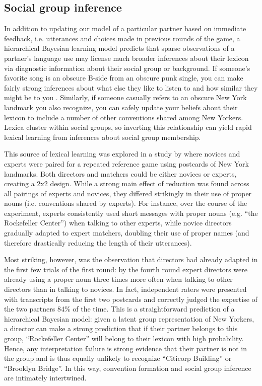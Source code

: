 \subsection{Social group inference}

In addition to updating our model of a particular partner based on immediate feedback, i.e. utterances and choices made in previous rounds of the game, a hierarchical Bayesian learning model predicts that sparse observations of a partner's language use may license much broader inferences about their lexicon via diagnostic information about their social group or background. If someone's favorite song is an obscure B-side from an obscure punk single, you can make fairly strong inferences about what else they like to listen to and how similar they might be to you \cite{VelezEtAl16_Overlaps, GershmanEtAl17_StructureSocialInfluence}. Similarly, if someone casually refers to an obscure New York landmark you also recognize, you can safely update your beliefs about their lexicon to include a number of other conventions shared among New Yorkers. Lexica cluster within social groups, so inverting this relationship can yield rapid lexical learning from inferences about social group membership.

This source of lexical learning was explored in a study by  where novices and experts were paired for a repeated reference game using postcards of New York landmarks. Both directors and matchers could be either novices or experts, creating a 2x2 design. While a strong main effect of reduction was found across all pairings of experts and novices, they differed strikingly in their use of proper nouns (i.e. conventions shared by experts). For instance, over the course of the experiment, experts consistently used short messages with proper nouns (e.g. ``the Rockefeller Center'') when talking to other experts, while novice directors gradually adapted to expert matchers, doubling their use of proper names (and therefore drastically reducing the length of their utterances).

Most striking, however, was the observation that directors had already adapted in the first few trials of the first round: by the fourth round expert directors were already using a proper noun three times more often when talking to other directors than in talking to novices. In fact, independent raters were presented with transcripts from the first two postcards and correctly judged the expertise of the two partners 84\% of the time. This is a straightforward prediction of a hierarchical Bayesian model: given a latent group representation of New Yorkers, a director can make a strong prediction that if their partner belongs to this group, ``Rockefeller Center'' will belong to their lexicon with high probability. Hence, any interpretation failure is strong evidence that their partner is not in the group and is thus equally unlikely to recognize ``Citicorp Building'' or ``Brooklyn Bridge''. In this way, convention formation and social group inference are intimately intertwined. 

